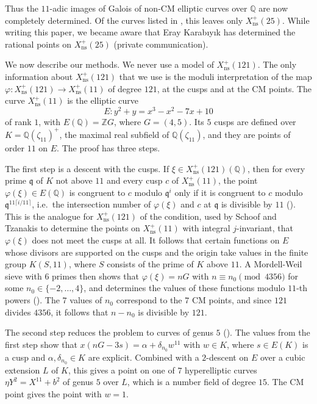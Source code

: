 \documentclass[11pt,reqno]{amsart}
\newcommand{\Q}{\mathbb{Q}}
\newcommand{\Z}{\mathbb{Z}}
\newcommand{\fq}{\mathfrak{q}}
\newcommand{\ns}{\mathrm{ns}}
\newcommand{\Xns}[1]{X_{\ns}^+(#1)}
\theoremstyle{definition}
\numberwithin{equation}{section}
\begin{document}
Thus the $11$-adic images of Galois of non-CM elliptic curves over $\Q$ are now completely determined. Of the curves listed in \cite[Theorem 1.6]{RSZB22}, this leaves only $\Xns{25}$. While writing this paper, we became aware that Eray Karab\i y\i k has determined the rational points on $\Xns{25}$ (private communication).

We now describe our methods. We never use a model of $\Xns{121}$. The only information about $\Xns{121}$ that we use is the moduli interpretation of the map $\varphi\colon \Xns{121}\rightarrow \Xns{11}$ of degree $121$, at the cusps and at the CM points. The curve $\Xns{11}$ is the elliptic curve
$$E\colon y^2+y=x^3-x^2-7x+10$$
of rank $1$, with $E(\Q)=\Z G$, where $G=(4,5)$. Its $5$ cusps are defined over $K=\Q(\zeta_{11})^+$, the maximal real subfield of $\Q(\zeta_{11})$, and they are points of order $11$ on $E$. The proof has three steps.

The first step is a descent with the cusps. If $\xi\in \Xns{121}(\Q)$, then for every prime $\fq$ of $K$ not above $11$ and every cusp $c$ of $\Xns{11}$, the point $\varphi(\xi)\in E(\Q)$ is congruent to $c$ modulo $\fq^i$ only if it is congruent to $c$ modulo $\fq^{11\lceil i/11\rceil}$, i.e.\ the intersection number of $\varphi(\xi)$ and $c$ at $\fq$ is divisible by $11$ (). This is the analogue for $\Xns{121}$ of the condition, used by Schoof and Tzanakis \cite{ST12} to determine the points on $\Xns{11}$ with integral $j$-invariant, that $\varphi(\xi)$ does not meet the cusps at all. It follows that certain functions on $E$ whose divisors are supported on the cusps and the origin take values in the finite group $K(S,11)$, where $S$ consists of the prime of $K$ above $11$. A Mordell-Weil sieve with $6$ primes then shows that $\varphi(\xi)=nG$ with $n\equiv n_0\pmod{4356}$ for some $n_0\in\{-2,\ldots,4\}$, and determines the values of these functions modulo $11$-th powers (). The $7$ values of $n_0$ correspond to the $7$ CM points, and since $121$ divides $4356$, it follows that $n-n_0$ is divisible by $121$.

The second step reduces the problem to curves of genus $5$ (). The values from the first step show that $x(nG-3s)=\alpha+\delta_{n_0}w^{11}$ with $w\in K$, where $s\in E(K)$ is a cusp and $\alpha,\delta_{n_0}\in K$ are explicit. Combined with a $2$-descent on $E$ over a cubic extension $L$ of $K$, this gives a point on one of $7$ hyperelliptic curves $\eta Y^2=X^{11}+b^2$ of genus $5$ over $L$, which is a number field of degree $15$. The CM point gives the point with $w=1$.
\end{document}
